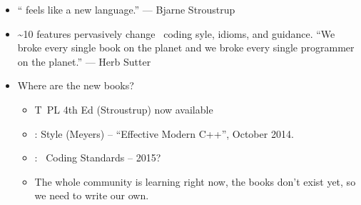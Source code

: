 \begin{itemize}

  \item \textquotedblleft{} feels like a new language.\textquotedblright{} --- Bjarne Stroustrup
    \pause{}

  \item \textasciitilde{}10 features pervasively change \CC\ coding
    syle, idioms, and guidance. {}``We broke every single book on the
    planet and we broke every single programmer on the planet.'' ---
    Herb Sutter

    \pause{}

  \item Where are the new books?

    \pause{}
    \begin{itemize}
    \item {} T\CC~PL 4th Ed (Stroustrup) now available
      \pause{}
      
    \item {}: Style (Meyers) -- ``Effective Modern
      C++'',  October 2014.
      \pause{}
      
    \item {}: \CC\ Coding Standards -- 2015?
      
      
      \pause{}
      
    \item The whole community is learning right now, the books don't
      exist yet, so we need to write our own.
    \end{itemize}
\end{itemize}

\lyxframeend{}



